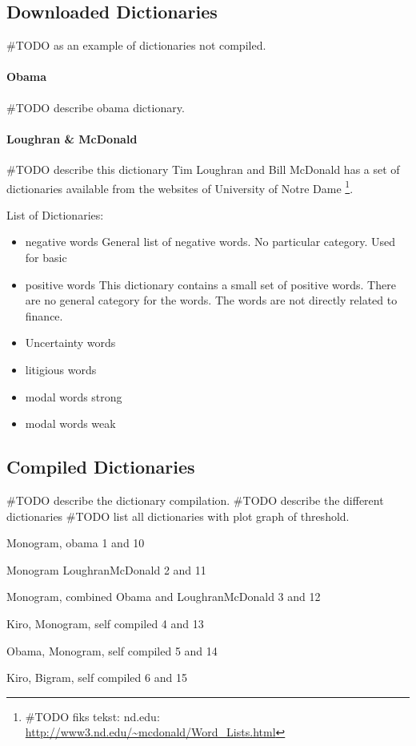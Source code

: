 \subsection{Downloaded Dictionaries}
#TODO as an example of dictionaries not compiled. 

\paragraph{Obama}
#TODO describe obama dictionary. 
\paragraph{Loughran & McDonald}
#TODO describe this dictionary
Tim Loughran and Bill McDonald has a set of dictionaries available from the
websites of University of Notre Dame \footnote{#TODO fiks tekst: nd.edu:
\url{http://www3.nd.edu/~mcdonald/Word_Lists.html}}. 

List of Dictionaries:
\begin{itemize}
    \item negative words
General list of negative words. No particular category. Used for basic   
    \item positive words
This dictionary contains a small set of positive words. There are no general
category for the words. The words are not directly related to finance. 
    \item Uncertainty words
    \item litigious words
    \item modal words strong
    \item modal words weak
\end{itemize}
%

\subsection{Compiled Dictionaries}

#TODO describe the dictionary compilation.
#TODO describe the different dictionaries 
#TODO list all dictionaries with plot graph of threshold. 

Monogram, obama
1 and 10

Monogram LoughranMcDonald
2 and 11

Monogram, combined Obama and LoughranMcDonald
3 and 12

Kiro, Monogram, self compiled
4 and 13

Obama, Monogram, self compiled
5 and 14

Kiro, Bigram, self compiled
6 and 15


